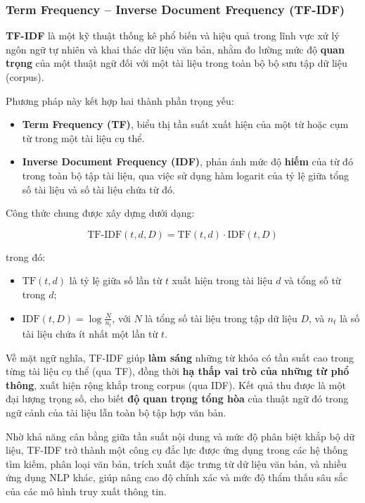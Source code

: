 \subsubsection{Term Frequency -- Inverse Document Frequency (TF-IDF)}
\textbf{TF-IDF} là một kỹ thuật thống kê phổ biến và hiệu quả trong lĩnh vực xử lý ngôn ngữ tự nhiên và khai thác dữ liệu văn bản, nhằm đo lường mức độ \textbf{quan trọng} của một thuật ngữ đối với một tài liệu trong toàn bộ bộ sưu tập dữ liệu (corpus).

Phương pháp này kết hợp hai thành phần trọng yếu:

\begin{itemize}
    \item \textbf{Term Frequency (TF)}, biểu thị tần suất xuất hiện của một từ hoặc cụm từ trong một tài liệu cụ thể.
    \item \textbf{Inverse Document Frequency (IDF)}, phản ánh mức độ \textbf{hiếm} của từ đó trong toàn bộ tập tài liệu, qua việc sử dụng hàm logarit của tỷ lệ giữa tổng số tài liệu và số tài liệu chứa từ đó.
\end{itemize}

Công thức chung được xây dựng dưới dạng:

\begin{equation}
    \text{TF-IDF}(t, d, D) = \text{TF}(t, d) \cdot \text{IDF}(t, D)
\end{equation}

trong đó:

\begin{itemize}
    \item \(\text{TF}(t,d)\) là tỷ lệ giữa số lần từ \(t\) xuất hiện trong tài liệu \(d\) và tổng số từ trong \(d\);
    \item \(\text{IDF}(t,D) = \log\frac{N}{n_t}\), với \(N\) là tổng số tài liệu trong tập dữ liệu \(D\), và \(n_t\) là số tài liệu chứa ít nhất một lần từ \(t\).
\end{itemize}

Về mặt ngữ nghĩa, TF-IDF giúp \textbf{làm sáng} những từ khóa có tần suất cao trong từng tài liệu cụ thể (qua TF), đồng thời \textbf{hạ thấp vai trò của những từ phổ thông}, xuất hiện rộng khắp trong corpus (qua IDF). Kết quả thu được là một đại lượng trọng số, cho biết \textbf{độ quan trọng tổng hòa} của thuật ngữ đó trong ngữ cảnh của tài liệu lẫn toàn bộ tập hợp văn bản.

Nhờ khả năng cân bằng giữa tần suất nội dung và mức độ phân biệt khắp bộ dữ liệu, TF-IDF trở thành một công cụ đắc lực được ứng dụng trong các hệ thống tìm kiếm, phân loại văn bản, trích xuất đặc trưng từ dữ liệu văn bản, và nhiều ứng dụng NLP khác, giúp nâng cao độ chính xác và mức độ thẩm thấu sâu sắc của các mô hình truy xuất thông tin.